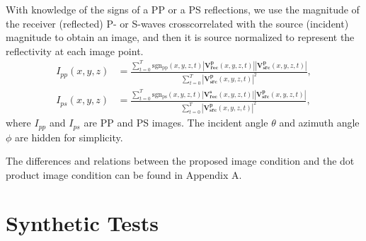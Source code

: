 \documentclass[manuscript,ulem,graphix,revised]{geophysics}
\begin{document}
With knowledge of the signs of a PP or a PS reflections, we use the magnitude of the receiver (reflected) P- or S-waves crosscorrelated with the source (incident) magnitude to obtain an image, and then it is source normalized to represent the reflectivity \citep{sheriff95} at each image point.
\begin{equation}
\begin{aligned}
I_{pp}(x,y,z)&=\frac{\sum_{t=0}^{T}\mathrm{sgn_{pp}}(x,y,z,t)|\mathbf{V^p_{rec}}(x,y,z,t)||\mathbf{V^p_{src}}(x,y,z,t)|}
                    {\sum_{t=0}^{T}|\mathbf{V^p_{src}}(x,y,z,t)|^2 },\\
I_{ps}(x,y,z)&=\frac{\sum_{t=0}^{T}\mathrm{sgn_{ps}}(x,y,z,t)|\mathbf{V^s_{rec}}(x,y,z,t)||\mathbf{V^p_{src}}(x,y,z,t)|}
                    {\sum_{t=0}^{T}|\mathbf{V^p_{src}}(x,y,z,t)|^2 },
\end{aligned}
\label{eqn:reflectivity}
\end{equation}
where $I_{pp}$ and $I_{ps}$ are PP and PS images. The incident angle $\theta$ and azimuth angle $\phi$ are hidden for simplicity.

The differences and relations between the proposed image condition and the dot product image condition \citep{wang_cl16} can be found in Appendix A.



\section{Synthetic Tests}
\end{document}
